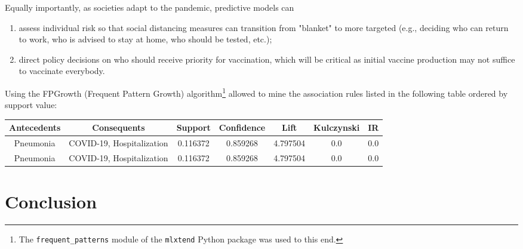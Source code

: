 \documentclass[11pt,a4paper]{article}
\begin{document}
Equally importantly, as societies adapt to the pandemic, predictive models can
\begin{enumerate}
    \item assess individual risk so that social distancing measures can
    transition from "blanket" to more targeted (e.g., deciding who can return to
    work, who is advised to stay at home, who should be tested, etc.);
    \item direct policy decisions on who should receive priority for
    vaccination, which will be critical as initial vaccine production may not
    suffice to vaccinate everybody.
\end{enumerate}
Using the FPGrowth (Frequent Pattern Growth) algorithm\footnote{The
\texttt{frequent\_patterns} module of the \texttt{mlxtend} Python package was
used to this end.} allowed to mine the association rules listed in the following
table ordered by support value:
\begin{center}
\hspace*{-1cm}
\begin{tabular}{ | c | c | c | c | c | c | c | }
    \rowcolor{gray!50}
    \hline
    Antecedents & Consequents & Support & Confidence & Lift & Kulczynski & IR\\
    \hline
    Pneumonia & COVID-19, Hospitalization & 0.116372 & 0.859268 & 4.797504 & 0.0 & 0.0\\
    \hline
    Pneumonia & COVID-19, Hospitalization & 0.116372 & 0.859268 & 4.797504 & 0.0 & 0.0\\
    \hline
\end{tabular}
\end{center}
\newpage
\section{Conclusion}

\newpage
\end{document}
